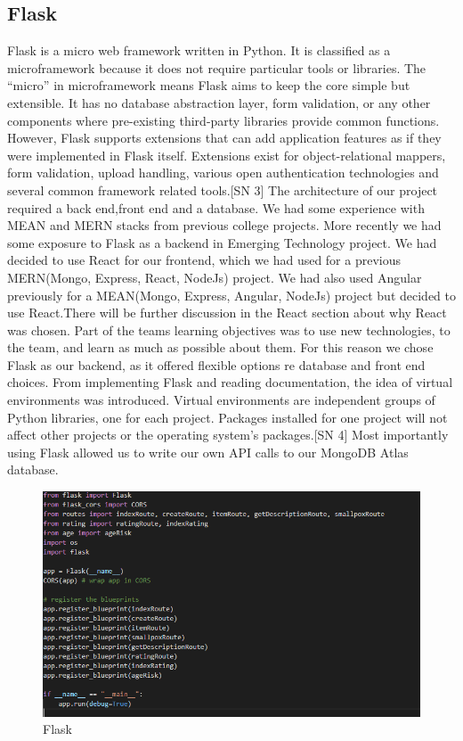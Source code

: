 \subsection{Flask}
Flask is a micro web framework written in Python. It is classified as a microframework because it does not require particular tools or libraries. The “micro” in microframework means Flask aims to keep the core simple but extensible. It has no database abstraction layer, form validation, or any other components where pre-existing third-party libraries provide common functions. However, Flask supports extensions that can add application features as if they were implemented in Flask itself. Extensions exist for object-relational mappers, form validation, upload handling, various open authentication technologies and several common framework related tools.[SN 3]
The architecture of our project required a back end,front end and a database. We had some experience with MEAN and MERN stacks from previous college projects. More recently we had some exposure to Flask as a backend in Emerging Technology project. We had decided to use React for our frontend, which we had used for a previous MERN(Mongo, Express, React, NodeJs) project. We had also used Angular previously for a MEAN(Mongo, Express, Angular, NodeJs) project but decided to use React.There will be further discussion in the React section about why React was chosen. Part of the teams learning objectives was to use new technologies, to the team, and learn as much as possible about them. For this reason we chose Flask as our backend, as it offered flexible options re database and front end choices. From implementing Flask and reading documentation, the idea of virtual environments was introduced. Virtual environments are independent groups of Python libraries, one for each project. Packages installed for one project will not affect other projects or the operating system’s packages.[SN 4]
Most importantly using Flask allowed us to write our own API calls to our MongoDB Atlas database.

\begin{figure}
    \centering
    \includegraphics[scale=0.5]{img/flask.PNG}
    \caption{Flask}
    \label{fig:my_label2}
\end{figure}















